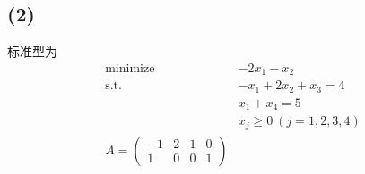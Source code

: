 \documentclass[8pt]{article}
\theoremstyle{compact}
\def\ge{\geqslant}
\begin{document}
\subsection*{(2)}
标准型为
\begin{equation*}
	\begin{split}
		\text{minimize} \quad & -2x_1 - x_2\\
		\text{s.t.} \quad& -x_1 + 2x_2 + x_3 = 4\\
		& x_1 + x_4 = 5\\
		& x_j \ge 0 \ (j = 1, 2, 3, 4)\\
		A = \begin{pmatrix}
			-1 & 2 & 1 & 0\\
			1 & 0 & 0 & 1
		\end{pmatrix}
	\end{split}
\end{equation*}
\end{document}
